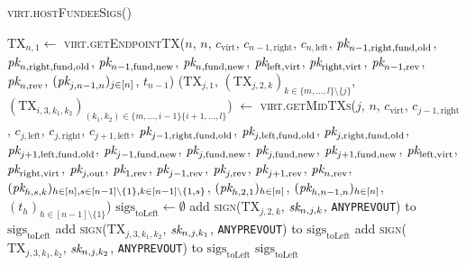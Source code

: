 \begin{center}
  \begin{processbox}{\textsc{virt.hostFundeeSigs}()}
    \begin{algorithmic}[1]
      \State $\mathrm{TX}_{n, 1} \gets$
      \textsc{virt}.\textsc{getEndpointTX}($n$, $n$, $c_{\mathrm{virt}}$,
      $c_{n-1, \mathrm{right}}$, $c_{n, \mathrm{left}}$, $\textit{pk}_{n-1,
      \mathrm{right}, \mathrm{fund}, \mathrm{old}}$, $\textit{pk}_{n, \mathrm{right},
      \mathrm{fund}, \mathrm{old}}$, $\textit{pk}_{n-1, \mathrm{fund}, \mathrm{new}}$,
      $\textit{pk}_{n, \mathrm{fund}, \mathrm{new}}$, $\textit{pk}_{\mathrm{left},
      \mathrm{virt}}$, $\textit{pk}_{\mathrm{right}, \mathrm{virt}}$, $\textit{pk}_{n-1,
      \mathrm{rev}}$, $\textit{pk}_{n, \mathrm{rev}}$, $(\textit{pk}_{j, n-1, n})_{j \in [n]}$,
      $t_{n-1}$)
      \label{code:virtual-layer:fundee-sigs:tx}
        \State ($\mathrm{TX}_{j, 1}$, $(\mathrm{TX}_{j, 2, k})_{k \in \{m,
        \dots, l\} \setminus \{j\}}$, $(\mathrm{TX}_{i, 3, k_1, k_2})_{(k_1,
        k_2) \in \{m, \dots, i-1\} \{i+1, \dots, l\}}$) $\gets$
        \textsc{virt.getMidTXs}($j$, $n$, $c_{\mathrm{virt}}$, $c_{j-1,
        \mathrm{right}}$, $c_{j, \mathrm{left}}$, $c_{j, \mathrm{right}}$,
        $c_{j+1, \mathrm{left}}$, $\textit{pk}_{j-1, \mathrm{right}, \mathrm{fund},
        \mathrm{old}}$, $\textit{pk}_{j, \mathrm{left}, \mathrm{fund}, \mathrm{old}}$,
        $\textit{pk}_{j, \mathrm{right}, \mathrm{fund}, \mathrm{old}}$, $\textit{pk}_{j+1,
        \mathrm{left}, \mathrm{fund}, \mathrm{old}}$, $\textit{pk}_{j-1, \mathrm{fund},
        \mathrm{new}}$, $\textit{pk}_{j, \mathrm{fund}, \mathrm{new}}$, $\textit{pk}_{j,
        \mathrm{fund}, \mathrm{new}}$, $\textit{pk}_{j+1, \mathrm{fund}, \mathrm{new}}$,
        $\textit{pk}_{\mathrm{left}, \mathrm{virt}}$, $\textit{pk}_{\mathrm{right},
        \mathrm{virt}}$, $\textit{pk}_{j, \mathrm{out}}$, $\textit{pk}_{1, \mathrm{rev}}$,
        $\textit{pk}_{j-1, \mathrm{rev}}$, $\textit{pk}_{j, \mathrm{rev}}$, $\textit{pk}_{j+1,
        \mathrm{rev}}$, $\textit{pk}_{n, \mathrm{rev}}$, $(\textit{pk}_{h,s,k})_{h \in [n], s \in
        [n-1] \setminus \{1\}, k \in [n-1] \setminus \{1, s\}}$, $(\textit{pk}_{h, 2,
        1})_{h \in [n]}$, $(\textit{pk}_{h, n-1, n})_{h \in [n]}$, $(t_h)_{h \in [n-1]
        \setminus \{1\}}$)
        \State $\mathrm{sigs}_{\mathrm{toLeft}} \gets \emptyset$
          \State add \textsc{sign}($\mathrm{TX}_{j, 2, k}$, $\textit{sk}_{n, j, k}$,
          \texttt{ANYPREVOUT}) to $\mathrm{sigs}_{\mathrm{toLeft}}$
        \EndFor
          \State add \textsc{sign}($\mathrm{TX}_{j, 3, k_1, k_2}$, $\textit{sk}_{n, j,
          k_1}$, \texttt{ANYPREVOUT}) to $\mathrm{sigs}_{\mathrm{toLeft}}$
          \State add \textsc{sign}($\mathrm{TX}_{j, 3, k_1, k_2}$, $\textit{sk}_{n, j,
          k_2}$, \texttt{ANYPREVOUT}) to $\mathrm{sigs}_{\mathrm{toLeft}}$
        \EndFor
      \EndFor
      \State \Return $\mathrm{sigs}_{\mathrm{toLeft}}$
    \end{algorithmic}
  \end{processbox}
  \label{code:virtual-layer:fundee-sigs}
\end{center} \ \\

